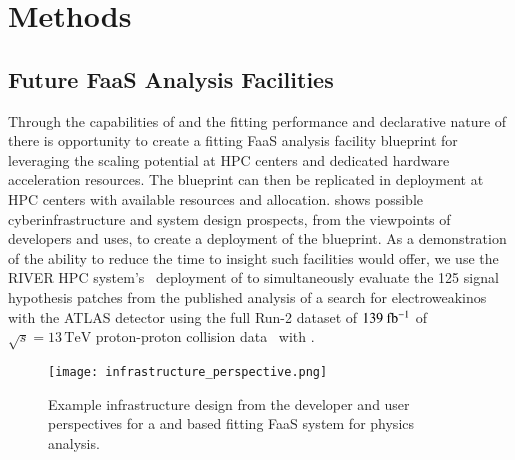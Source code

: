 \section{Methods}\label{sec:methods}
%

%

%
\subsection{Future FaaS Analysis Facilities}\label{subsec:FaaS_analysis_facilities}

Through the capabilities of \funcX{} and the fitting performance and declarative nature of \pyhf{} there is opportunity to create a fitting FaaS analysis facility blueprint for leveraging the scaling potential at HPC centers and dedicated hardware acceleration resources.
The blueprint can then be replicated in deployment at HPC centers with available resources and allocation.
 shows possible cyberinfrastructure and system design prospects, from the viewpoints of developers and uses, to create a deployment of the blueprint.
As a demonstration of the ability to reduce the time to insight such facilities would offer, we use the RIVER HPC system's~\cite{RIVER_HPC} deployment of \funcX{} to simultaneously evaluate the 125 signal hypothesis patches from the published analysis of a search for electroweakinos with the ATLAS detector using the full Run-2 dataset of \(139~\ifb\) of \(\sqrt{s} = 13\,\text{TeV}\) proton-proton collision data~\cite{SUSY-2019-08} with \pyhf{}.
\\

\begin{figure}[!htpb]
    \centering
    \texttt{[image: infrastructure\_perspective.png]}
    \caption{Example infrastructure design from the developer and user perspectives for a \pyhf{} and \funcX{} based fitting FaaS system for physics analysis.~\cite{portable_inference_workshop}}
    \label{fig:infrastructure_perspective}
\end{figure}
